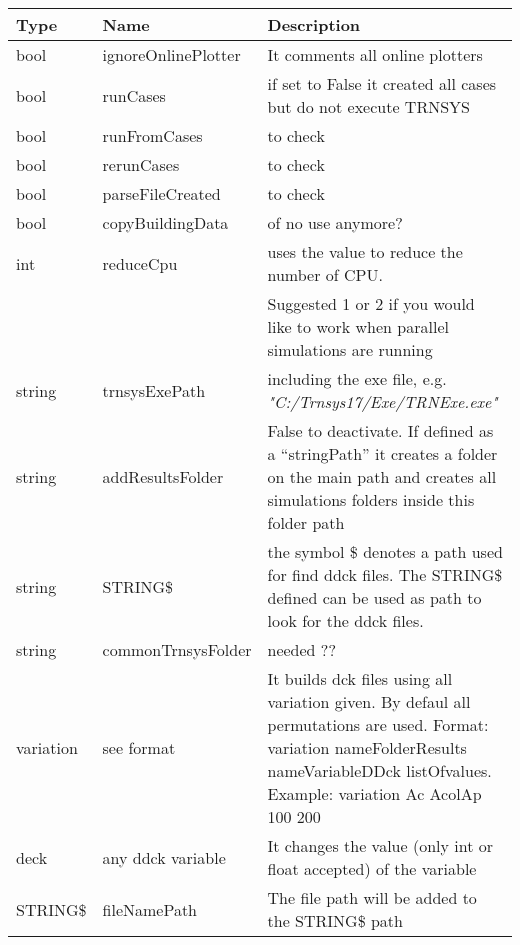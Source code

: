 \documentclass[english]{SPFReport}
\begin{document}
\begin{tabular}{| p{15mm} |  p{35mm} | p{100mm}  |}
\hline
\textbf{Type} & \textbf{Name} & \textbf{Description} \\
\hline
 bool & ignoreOnlinePlotter &  It comments all online plotters  \\
 bool & runCases & if set to False it created all cases but do not execute TRNSYS  \\
 bool & runFromCases & to check \\
 bool & rerunCases & to check  \\
 bool & parseFileCreated &  to check  \\
 bool & copyBuildingData &  of no use anymore?   \\
 int & reduceCpu &  uses the value to reduce the number of CPU. \\&&Suggested 1 or 2 if you would like to work when parallel simulations are running  \\
 string & trnsysExePath & including the exe file, e.g. \textit{"C:/Trnsys17/Exe/TRNExe.exe"} \\
 string & addResultsFolder & False to deactivate. If defined as a ``stringPath'' it creates a folder on the main path and creates all simulations folders inside this folder path\\
  string & STRING\$ & the symbol \$ denotes a path used for find ddck files. The STRING\$ defined can be used as path to look for the ddck files.\\
 string & commonTrnsysFolder & needed ?? \\
  variation & see format& It builds dck files using all variation given.  By defaul all permutations are used. Format: variation nameFolderResults nameVariableDDck listOfvalues. Example:   variation Ac AcolAp 100 200\\
    deck & any ddck variable & It changes the value (only int or float accepted) of the variable \\
   STRING\$ & fileNamePath & The file path will be added to the STRING\$ path \\   
\hline
\end{tabular}
\end{document}
